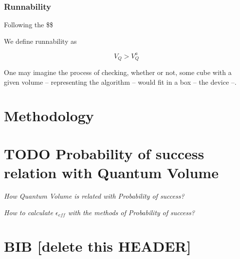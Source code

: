 \documentclass[11pt]{article}
\begin{document}
\subsubsection{Runnability}
\label{sec:org513bb98}

Following the \$\$

We define runnability as 

$$V_Q > V_Q^a$$

One may imagine the process of checking, whether or not, some cube with a given volume -- representing the algorithm -- would fit in a box -- the device --.

\section{Methodology}
\label{sec:org6467016}

\section{{\bfseries\sffamily TODO} Probability of success relation with Quantum Volume}
\label{sec:org65879e8}

\emph{How Quantum Volume is related with Probability of success?}

\emph{How to calculate \(\epsilon_{eff}\) with the methods of Probability of success?}



\section{BIB [delete this HEADER]}
\label{sec:org569c2b2}



\end{document}
